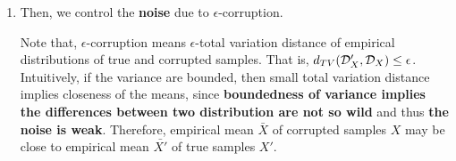 {\begin{enumerate}
{\begin{enumerate}
                For example, if we assume boundedness of $\|X_1'-\mu\|$, by matrix bernstein inequalities we have
                \begin{align*}
                    \mb P\left(\left\|\frac{1}{n}\sum_{i=1}^n(X_i'-\mu)(X_i'-\mu)^T-\Sigma\right\|\ge \epsilon\right) \le 2d \exp\left\{-O\left(\frac{n\epsilon^2}{\|\Sigma\|+\epsilon}\right)\right\}.
                \end{align*}
                Note that there exists other condition such as boundedness of the fourth moment.
        \end{enumerate}
    }
    This means, when $n$ is sufficiently large, \textbf{signal} from empirical mean of true samples is \textbf{strong} enough for estimation. However, the true samples are contaminated and some information is lost.

    \item Then, we control the \textbf{noise} due to $\epsilon$-corruption. 
    
    Note that, $\epsilon$-corruption means $\epsilon$-total variation distance of empirical distributions of true and corrupted samples.
    That is, $d_{TV}(\mathcal{D}_X', \mathcal{D}_X)\le \epsilon$.
    Intuitively, if the variance are bounded, then small total variation distance implies closeness of the means, 
    since \textbf{boundedness of variance implies the differences between two distribution are not so wild} and thus \textbf{the noise is weak}.
    Therefore, empirical mean $\bar{X}$ of corrupted samples $X$ may be close to empirical mean $\bar{X'}$ of true samples $X'$.


\end{enumerate}}
